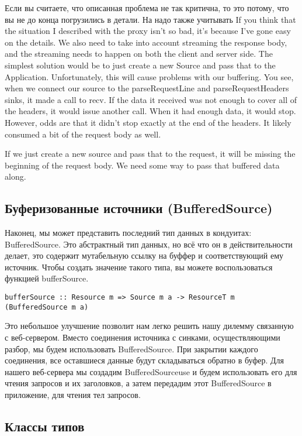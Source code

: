 Если вы считаете, что описанная проблема не так критична, то это потому, что вы не до конца погрузились в детали. На надо также учитывать
If you think that the situation I described with the proxy isn't so bad, it's because I've
gone easy on the details. We also need to take into account streaming the response body,
and the
streaming needs to happen on both the client and server side.
The simplest solution would be to just create a new Source and pass that to
the Application. Unfortunately, this will cause problems with our buffering. You
see, when we connect our source to the parseRequestLine and
parseRequestHeaders sinks, it made a call to recv. If the data
it received was not enough to cover all of the headers, it would issue another call. When
it had
enough data, it would stop. However, odds are that it didn't stop exactly at the end of
the headers. It likely consumed a bit of the request body as well.

If we just create a new source and pass that to the request, it will be missing the
beginning of the request body. We need some way to pass that buffered data along.

\subsection{Буферизованные источники (BufferedSource)}

Наконец, мы может представить последний тип данных в кондуитах: BufferedSource. Это абстрактный тип данных, но всё что он в действительности делает, это содержит мутабельную ссылку на буффер и соответствующий ему источник. Чтобы создать значение такого типа, вы можете воспользоваться функцией bufferSource.
\begin{verbatim}
bufferSource :: Resource m => Source m a -> ResourceT m (BufferedSource m a)
\end{verbatim}
Это небольшое улучшение позволит нам легко решить нашу дилемму связанную с веб-сервером.
Вместо соединения источника с синками, осуществляющими разбор, мы будем использовать 
BufferedSource. При закрытии каждого соединения, все оставшиеся данные будут складываться
обратно в буфер. Для нашего веб-сервера мы создадим BufferedSourceuse и будем использовать 
его для чтения запросов и их заголовков, а затем передадим этот BufferedSource в приложение, для чтения тел запросов.

\subsection{Классы типов}

